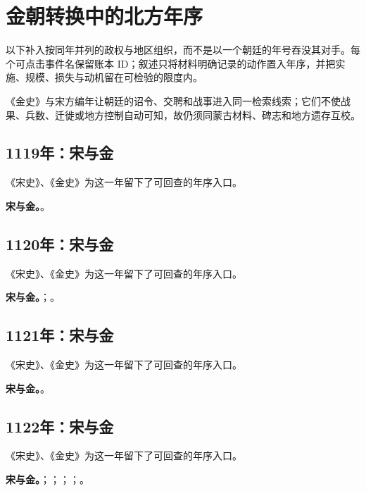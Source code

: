 \section{金朝转换中的北方年序}
以下补入按同年并列的政权与地区组织，而不是以一个朝廷的年号吞没其对手。每个可点击事件名保留账本 ID；叙述只将材料明确记录的动作置入年序，并把实施、规模、损失与动机留在可检验的限度内。

《金史》与宋方编年让朝廷的诏令、交聘和战事进入同一检索线索；它们不使战果、兵数、迁徙或地方控制自动可知，故仍须同蒙古材料、碑志和地方遗存互校。

\subsection{1119年：宋与金}
《宋史》、《金史》为这一年留下了可回查的年序入口。

\noindent\textbf{宋与金。}。

\subsection{1120年：宋与金}
《宋史》、《金史》为这一年留下了可回查的年序入口。

\noindent\textbf{宋与金。}；。

\subsection{1121年：宋与金}
《宋史》、《金史》为这一年留下了可回查的年序入口。

\noindent\textbf{宋与金。}。

\subsection{1122年：宋与金}
《宋史》、《金史》为这一年留下了可回查的年序入口。

\noindent\textbf{宋与金。}；；；；。

